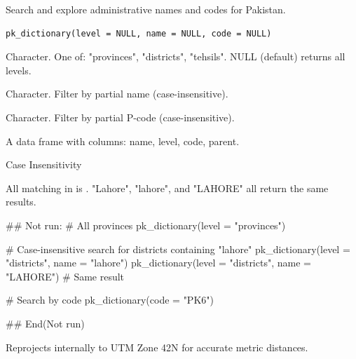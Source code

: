 \documentclass[a4paper]{book}
\begin{document}
%
\begin{Description}
Search and explore administrative names and codes for Pakistan.
\end{Description}
%
\begin{Usage}
\begin{verbatim}
pk_dictionary(level = NULL, name = NULL, code = NULL)
\end{verbatim}
\end{Usage}
%
\begin{Arguments}
\begin{ldescription}
\item[\code{level}] Character. One of: "provinces", "districts", "tehsils".
NULL (default) returns all levels.

\item[\code{name}] Character. Filter by partial name (case-insensitive).

\item[\code{code}] Character. Filter by partial P-code (case-insensitive).
\end{ldescription}
\end{Arguments}
%
\begin{Value}
A data frame with columns: name, level, code, parent.
\end{Value}
%
\begin{Section}{Case Insensitivity}

All matching in  is .
"Lahore", "lahore", and "LAHORE" all return the same results.
\end{Section}
%
\begin{Examples}
\begin{ExampleCode}
## Not run: 
  # All provinces
  pk_dictionary(level = "provinces")

  # Case-insensitive search for districts containing "lahore"
  pk_dictionary(level = "districts", name = "lahore")
  pk_dictionary(level = "districts", name = "LAHORE")  # Same result

  # Search by code
  pk_dictionary(code = "PK6")

## End(Not run)
\end{ExampleCode}
\end{Examples}
%
\begin{Description}
Reprojects internally to UTM Zone 42N for accurate metric distances.
\end{Description}
\end{document}
